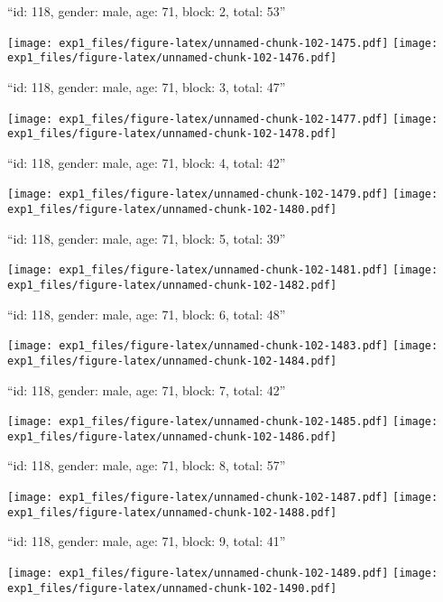 \documentclass[11pt,,]{article}
\begin{document}
\newpage
[1] 

``id: 118, gender: male, age: 71, block: 2, total: 53''

\texttt{[image: exp1\_files/figure-latex/unnamed-chunk-102-1475.pdf]}
\texttt{[image: exp1\_files/figure-latex/unnamed-chunk-102-1476.pdf]}

\newpage
[1] 

``id: 118, gender: male, age: 71, block: 3, total: 47''

\texttt{[image: exp1\_files/figure-latex/unnamed-chunk-102-1477.pdf]}
\texttt{[image: exp1\_files/figure-latex/unnamed-chunk-102-1478.pdf]}

\newpage
[1] 

``id: 118, gender: male, age: 71, block: 4, total: 42''

\texttt{[image: exp1\_files/figure-latex/unnamed-chunk-102-1479.pdf]}
\texttt{[image: exp1\_files/figure-latex/unnamed-chunk-102-1480.pdf]}

\newpage
[1] 

``id: 118, gender: male, age: 71, block: 5, total: 39''

\texttt{[image: exp1\_files/figure-latex/unnamed-chunk-102-1481.pdf]}
\texttt{[image: exp1\_files/figure-latex/unnamed-chunk-102-1482.pdf]}

\newpage
[1] 

``id: 118, gender: male, age: 71, block: 6, total: 48''

\texttt{[image: exp1\_files/figure-latex/unnamed-chunk-102-1483.pdf]}
\texttt{[image: exp1\_files/figure-latex/unnamed-chunk-102-1484.pdf]}

\newpage
[1] 

``id: 118, gender: male, age: 71, block: 7, total: 42''

\texttt{[image: exp1\_files/figure-latex/unnamed-chunk-102-1485.pdf]}
\texttt{[image: exp1\_files/figure-latex/unnamed-chunk-102-1486.pdf]}

\newpage
[1] 

``id: 118, gender: male, age: 71, block: 8, total: 57''

\texttt{[image: exp1\_files/figure-latex/unnamed-chunk-102-1487.pdf]}
\texttt{[image: exp1\_files/figure-latex/unnamed-chunk-102-1488.pdf]}

\newpage
[1] 

``id: 118, gender: male, age: 71, block: 9, total: 41''

\texttt{[image: exp1\_files/figure-latex/unnamed-chunk-102-1489.pdf]}
\texttt{[image: exp1\_files/figure-latex/unnamed-chunk-102-1490.pdf]}
\end{document}
